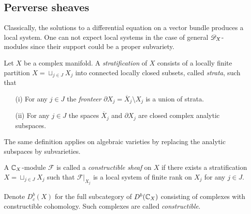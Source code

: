 \subsection{Perverse sheaves}
  Classically, the solutions to a differential equation on a vector bundle produces a local system.
  One can not expect local systems in the case of general $\mathscr{D}_X$-modules since their support could be a proper subvariety.
  \begin{definition}
    Let $X$ be a complex manifold. A {\it stratification} of $X$ consists of a locally finite partition $X  = \sqcup_{j\in J} X_j$ into connected locally closed subsets, called {\it strata}, such that
    \begin{enumerate}
      \item[(i)] For any $j\in J$ the {\it fronteer} $\partial X_j = \overline{X}_j\setminus X_j$ is a union of strata.
      \item[(ii)] For any $j\in J$ the spaces $\overline{X}_j$ and $\partial X_j$ are closed complex analytic subspaces.
    \end{enumerate}
  \end{definition}
  The same definition applies on algebraic varieties by replacing the analytic subspaces by subvarieties.
  \begin{definition}
     A $\mathbb{C}_X$-module $\mathcal{F}$ is called a {\it constructible sheaf} on $X$ if there exists a stratification $X = \sqcup_{j\in J}X_j$ such that $\mathcal{F}\vert_{X_j}$ is a local system of finite rank on $X_j$ for any $j\in J$.
  \end{definition}
  Denote $D^b_c(X)$ for the full subcategory of $D^b(\mathbb{C}_X)$ consisting of complexes with constructible cohomology.
  Such complexes are called {\it constructible}.

